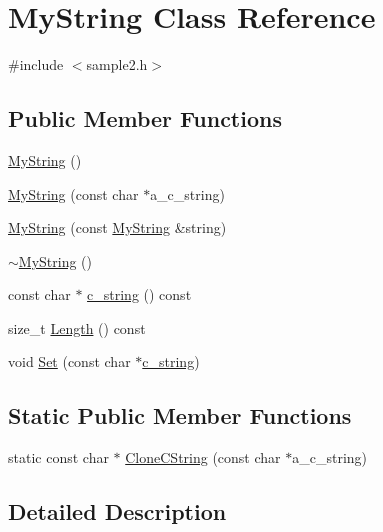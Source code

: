 \hypertarget{class_my_string}{}\section{My\+String Class Reference}
\label{class_my_string}


{\ttfamily \#include $<$sample2.\+h$>$}

\subsection*{Public Member Functions}
\begin{DoxyCompactItemize}
\item 
\hyperlink{class_my_string_a1cb17852b83614394b59720779c5f918}{My\+String} ()
\item 
\hyperlink{class_my_string_a28134eb91b6698f46b12accefa157d0f}{My\+String} (const char $\ast$a\+\_\+c\+\_\+string)
\item 
\hyperlink{class_my_string_ae24c7cf89a58dd2287303df2ac054c66}{My\+String} (const \hyperlink{class_my_string}{My\+String} \&string)
\item 
\hyperlink{class_my_string_a7bee4fe8ad82a0b7b8f65b02054b156b}{$\sim$\+My\+String} ()
\item 
const char $\ast$ \hyperlink{class_my_string_a0089588935fc8235124f58f514cb07a1}{c\+\_\+string} () const 
\item 
size\+\_\+t \hyperlink{class_my_string_a878f7e0a327814729a04a412d7b95801}{Length} () const 
\item 
void \hyperlink{class_my_string_a521c4cd7eccac6ce554d8a51505e4970}{Set} (const char $\ast$\hyperlink{class_my_string_a0089588935fc8235124f58f514cb07a1}{c\+\_\+string})
\end{DoxyCompactItemize}
\subsection*{Static Public Member Functions}
\begin{DoxyCompactItemize}
\item 
static const char $\ast$ \hyperlink{class_my_string_a40753dcfa3314a8993f32bdd75d67ce2}{Clone\+C\+String} (const char $\ast$a\+\_\+c\+\_\+string)
\end{DoxyCompactItemize}


\subsection{Detailed Description}


